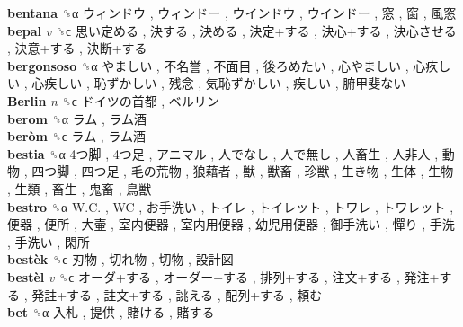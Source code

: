 \textbf{bentana} ␝α   ウィンドウ ,  ウィンドー ,  ウインドウ ,  ウインドー ,  窓 ,  窗 ,  風窓   \\
\textbf{bepal} \emph{v}  ␝ϲ   思い定める ,  決する ,  決める ,  決定+する ,  決心+する ,  決心させる ,  決意+する ,  決断+する   \\
\textbf{bergonsoso} ␝α   やましい ,  不名誉 ,  不面目 ,  後ろめたい ,  心やましい ,  心疚しい ,  心疾しい ,  恥ずかしい ,  残念 ,  気恥ずかしい ,  疾しい ,  腑甲斐ない   \\
\textbf{Berlin} \emph{n}  ␝ϲ   ドイツの首都 ,  ベルリン   \\
\textbf{berom} ␝α   ラム ,  ラム酒   \\
\textbf{beròm} ␝ϲ   ラム ,  ラム酒   \\
\textbf{bestia} ␝α   4つ脚 ,  4つ足 ,  アニマル ,  人でなし ,  人で無し ,  人畜生 ,  人非人 ,  動物 ,  四つ脚 ,  四つ足 ,  毛の荒物 ,  狼藉者 ,  獣 ,  獣畜 ,  珍獣 ,  生き物 ,  生体 ,  生物 ,  生類 ,  畜生 ,  鬼畜 ,  鳥獣   \\
\textbf{bestro} ␝α   W.C. ,  WC ,  お手洗い ,  トイレ ,  トイレット ,  トワレ ,  トワレット ,  便器 ,  便所 ,  大壷 ,  室内便器 ,  室内用便器 ,  幼児用便器 ,  御手洗い ,  憚り ,  手洗 ,  手洗い ,  閑所   \\
\textbf{bestèk} ␝ϲ   刃物 ,  切れ物 ,  切物 ,  設計図   \\
\textbf{bestèl} \emph{v}  ␝ϲ   オーダ+する ,  オーダー+する ,  排列+する ,  注文+する ,  発注+する ,  発註+する ,  註文+する ,  誂える ,  配列+する ,  頼む   \\
\textbf{bet} ␝α   入札 ,  提供 ,  賭ける ,  賭する   \\
